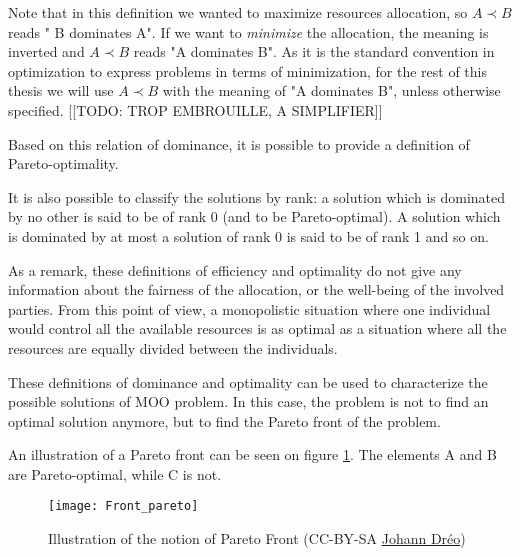 
Note that in this definition we wanted to maximize resources allocation, so \(A \prec B\) reads " B dominates A". If we want to \emph{minimize} the allocation, the meaning is inverted and  \(A \prec B\) reads "A dominates B".
As it is the standard convention in optimization to express problems in terms of minimization, for the rest of this thesis we will use \(A \prec B\) with the meaning of "A dominates B", unless otherwise specified. [[TODO: TROP EMBROUILLE, A SIMPLIFIER]]

Based on this relation of dominance, it is possible to provide a definition of Pareto-optimality.



It is also possible to classify the solutions by rank: a solution which is dominated by no other is said to be of rank 0 (and to be Pareto-optimal). A solution which is dominated by at most a solution of rank 0 is said to be of rank 1 and so on.

As a remark, these definitions of efficiency and optimality do not give any information about the fairness of the allocation, or the well-being of the involved parties. From this point of view, a monopolistic situation where one individual would control all the available resources is as optimal as a situation where all the resources are equally divided between the individuals.

These definitions of dominance and optimality can be used to characterize the possible solutions of MOO problem. In this case, the problem is not to find an optimal solution anymore, but to find the Pareto front of the problem.

An illustration of a Pareto front can be seen on figure \ref{Front_Pareto}. The elements A and B are Pareto-optimal, while C is not.


\begin{figure}
\centering
\texttt{[image: Front\_pareto]}\\
\caption{Illustration of the notion of Pareto Front (CC-BY-SA \href{http://en.wikipedia.org/wiki/File:Front_pareto.svg}{Johann Dréo})}

\label{Front_Pareto}
\end{figure}

